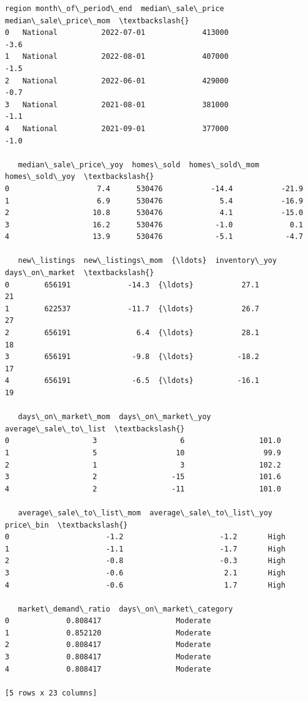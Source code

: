 \documentclass[11pt]{article}
\makeatletter
\newcommand{\boxspacing}{\kern\kvtcb@left@rule\kern\kvtcb@boxsep}
\newcommand{\prompt}[4]{
        {\ttfamily\llap{{\color{#2}[#3]:\hspace{3pt}#4}}\vspace{-\baselineskip}}
    }
\makeatother
\begin{document}
            \begin{tcolorbox}[breakable, size=fbox, boxrule=.5pt, pad at break*=1mm, opacityfill=0]
\prompt{Out}{outcolor}{33}{\boxspacing}
\begin{Verbatim}[commandchars=\\\{\}]
      region month\_of\_period\_end  median\_sale\_price  median\_sale\_price\_mom  \textbackslash{}
0   National          2022-07-01             413000                   -3.6
1   National          2022-08-01             407000                   -1.5
2   National          2022-06-01             429000                   -0.7
3   National          2021-08-01             381000                   -1.1
4   National          2021-09-01             377000                   -1.0

   median\_sale\_price\_yoy  homes\_sold  homes\_sold\_mom  homes\_sold\_yoy  \textbackslash{}
0                    7.4      530476           -14.4           -21.9
1                    6.9      530476             5.4           -16.9
2                   10.8      530476             4.1           -15.0
3                   16.2      530476            -1.0             0.1
4                   13.9      530476            -5.1            -4.7

   new\_listings  new\_listings\_mom  {\ldots}  inventory\_yoy  days\_on\_market  \textbackslash{}
0        656191             -14.3  {\ldots}           27.1              21
1        622537             -11.7  {\ldots}           26.7              27
2        656191               6.4  {\ldots}           28.1              18
3        656191              -9.8  {\ldots}          -18.2              17
4        656191              -6.5  {\ldots}          -16.1              19

   days\_on\_market\_mom  days\_on\_market\_yoy  average\_sale\_to\_list  \textbackslash{}
0                   3                   6                 101.0
1                   5                  10                  99.9
2                   1                   3                 102.2
3                   2                 -15                 101.6
4                   2                 -11                 101.0

   average\_sale\_to\_list\_mom  average\_sale\_to\_list\_yoy  price\_bin  \textbackslash{}
0                      -1.2                      -1.2       High
1                      -1.1                      -1.7       High
2                      -0.8                      -0.3       High
3                      -0.6                       2.1       High
4                      -0.6                       1.7       High

   market\_demand\_ratio  days\_on\_market\_category
0             0.808417                 Moderate
1             0.852120                 Moderate
2             0.808417                 Moderate
3             0.808417                 Moderate
4             0.808417                 Moderate

[5 rows x 23 columns]
\end{Verbatim}
\end{tcolorbox}
        
\end{document}

